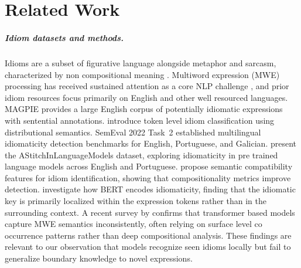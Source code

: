 \documentclass[11pt, a4paper]{report}
\begin{document}

\chapter{Related Work}

\paragraph{Idiom datasets and methods.}
Idioms are a subset of figurative language alongside metaphor and sarcasm, characterized by non compositional meaning \citep{shutova2015design}. Multiword expression (MWE) processing has received sustained attention as a core NLP challenge \citep{constant2017survey}, and prior idiom resources focus primarily on English and other well resourced languages. MAGPIE \citep{haagsma2020magpie} provides a large English corpus of potentially idiomatic expressions with sentential annotations. \citet{salton2016idiom} introduce token level idiom classification using distributional semantics. SemEval 2022 Task~2 \citep{peng2022semeval} established multilingual idiomaticity detection benchmarks for English, Portuguese, and Galician. \citet{tayyar2022epie} present the AStitchInLanguageModels dataset, exploring idiomaticity in pre trained language models across English and Portuguese. \citet{zeng2021idiomatic} propose semantic compatibility features for idiom identification, showing that compositionality metrics improve detection. \citet{nedumpozhimana2021finding} investigate how BERT encodes idiomaticity, finding that the idiomatic key is primarily localized within the expression tokens rather than in the surrounding context. A recent survey by \citet{miletic2024mwesurvey} confirms that transformer based models capture MWE semantics inconsistently, often relying on surface level co occurrence patterns rather than deep compositional analysis. These findings are relevant to our observation that models recognize seen idioms locally but fail to generalize boundary knowledge to novel expressions.
\end{document}
